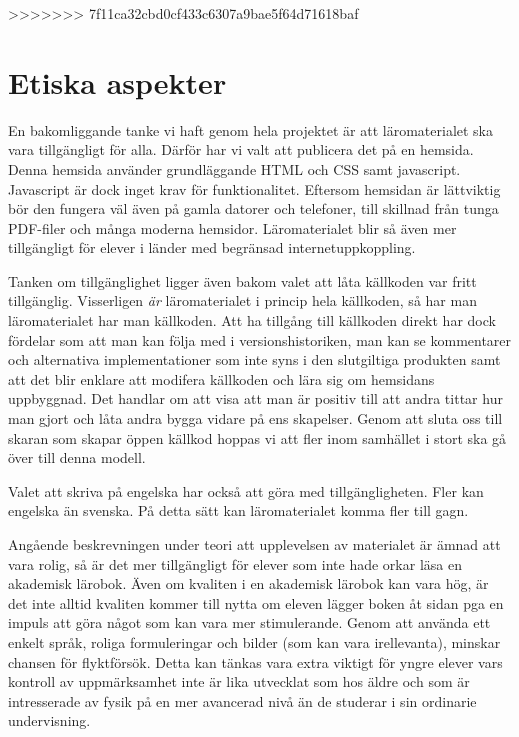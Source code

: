 \begin{draft}
>>>>>>> 7f11ca32cbd0cf433c6307a9bae5f64d71618baf

\section{Etiska aspekter}

En bakomliggande tanke vi haft genom hela projektet är att läromaterialet ska
vara tillgängligt för alla. Därför har vi valt att publicera det på en hemsida.
Denna hemsida använder grundläggande HTML och CSS samt javascript. Javascript är
dock inget krav för funktionalitet. Eftersom hemsidan är lättviktig bör den
fungera väl även på gamla datorer och telefoner, till skillnad från tunga
PDF-filer och många moderna hemsidor. Läromaterialet blir så även mer tillgängligt för
elever i länder med begränsad internetuppkoppling.

Tanken om tillgänglighet ligger även bakom valet att låta källkoden var fritt
tillgänglig. Visserligen \textit{är} läromaterialet i princip hela källkoden, så
har man läromaterialet har man källkoden. Att ha tillgång till källkoden direkt har dock
fördelar som att man kan följa med i versionshistoriken, man kan se kommentarer
och alternativa implementationer som inte syns i den slutgiltiga produkten samt
att det blir enklare att modifera källkoden och lära sig om hemsidans uppbyggnad.
Det handlar om att visa att man är positiv till att
andra tittar hur man gjort och låta andra bygga vidare på ens skapelser. Genom
att sluta oss till skaran som skapar öppen källkod hoppas vi att fler inom
samhället i stort ska gå över till denna modell.

Valet att skriva på engelska har också att göra med tillgängligheten. Fler kan
engelska än svenska. På detta sätt kan läromaterialet komma fler till gagn.

Angående beskrevningen under teori att upplevelsen av materialet är ämnad att vara rolig, så
är det mer tillgängligt för elever som inte hade orkar läsa en akademisk lärobok. Även om
kvaliten i en akademisk lärobok kan vara hög, är det inte alltid kvaliten kommer till nytta om
eleven lägger boken åt sidan pga en impuls att göra något som kan vara mer stimulerande.
Genom att använda ett enkelt språk, roliga formuleringar och bilder (som kan vara irellevanta), 
minskar chansen för flyktförsök. Detta kan tänkas vara extra viktigt för yngre elever vars kontroll av
uppmärksamhet inte är lika utvecklat som hos äldre och som är intresserade av fysik på en mer avancerad nivå
än de studerar i sin ordinarie undervisning.

\end{draft}
